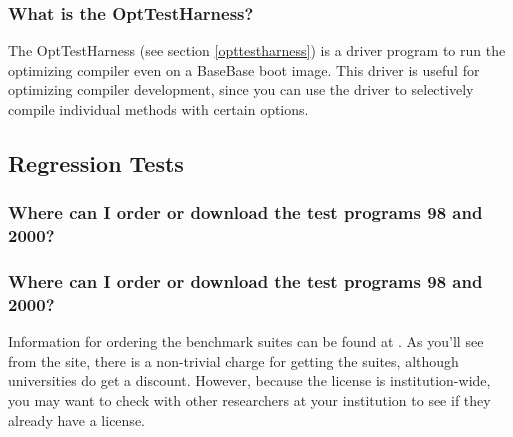 \subsubsection{What is the OptTestHarness?}

The OptTestHarness (see section \ref{opttestharness}) is a driver
program to run the optimizing compiler even on a BaseBase boot image.
This driver is useful for optimizing compiler development, since you
can use the driver to selectively compile individual methods with
certain options.

\subsection{Regression Tests}

\W \subsubsection{Where can I order or download the test programs 
\W \SPECjvmR{}98 and \SPECjbbR{}2000?}
\T \subsubsection{Where can I order or download the test programs 
\T  \SPECjvmRheading{}98 and \SPECjbbRheading{}2000?}

Information for ordering the \SPECR{} benchmark suites can be found at
.
As you'll see from the site, there is a non-trivial charge for getting the
suites, although universities do get a discount.
However, because the license is institution-wide, you may want to check with
other researchers at your institution to see if they already have a license.

\JavaTMFooter
